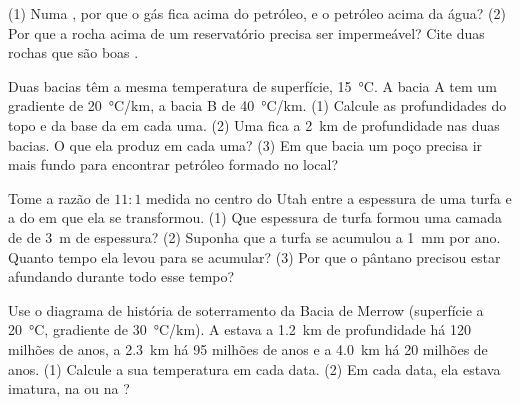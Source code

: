 \begin{exercise}[$\star$]\label{exo:g11:fossil-fuel-geology:5}
(1) Numa , por que o gás fica acima do petróleo, e o petróleo
acima da água? (2) Por que a rocha acima de um reservatório precisa ser
impermeável? Cite duas rochas que são boas .
\end{exercise}

\begin{exercise}[$\star\star$]\label{exo:g11:fossil-fuel-geology:6}
Duas bacias têm a mesma temperatura de superfície, \qty{15}{\degreeCelsius}.
A bacia A tem um gradiente de \qty{20}{\degreeCelsius/km}, a bacia B de
\qty{40}{\degreeCelsius/km}. (1) Calcule as profundidades do topo e da base
da  em cada uma. (2) Uma  fica a
\qty{2}{km} de profundidade nas duas bacias. O que ela produz em cada uma?
(3) Em que bacia um poço precisa ir mais fundo para encontrar petróleo
formado no local?
\end{exercise}

\begin{exercise}[$\star\star$]\label{exo:g11:fossil-fuel-geology:7}
Tome a razão de $11{:}1$ medida no centro do Utah entre a espessura de uma
turfa e a do  em que ela se transformou. (1) Que espessura de turfa
formou uma camada de  de \qty{3}{m} de espessura? (2) Suponha que a
turfa se acumulou a \qty{1}{mm} por ano. Quanto tempo ela levou para se
acumular? (3) Por que o pântano precisou estar afundando durante todo esse
tempo?
\end{exercise}

\begin{exercise}[$\star\star$]\label{exo:g11:fossil-fuel-geology:8}
Use o diagrama de história de soterramento da Bacia de Merrow (superfície a
\qty{20}{\degreeCelsius}, gradiente de \qty{30}{\degreeCelsius/km}). A  estava a \qty{1.2}{km} de profundidade há 120 milhões de anos, a
\qty{2.3}{km} há 95 milhões de anos e a \qty{4.0}{km} há 20 milhões de
anos. (1) Calcule a sua temperatura em cada data. (2) Em cada data, ela
estava imatura, na  ou na ?
\end{exercise}

